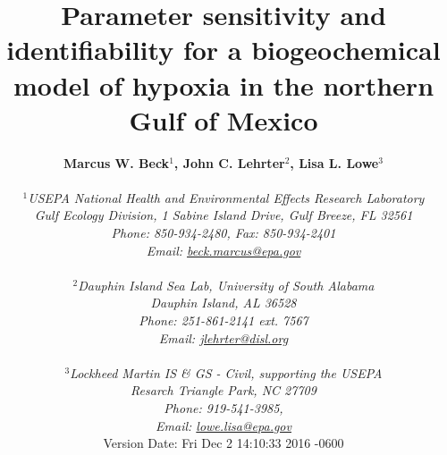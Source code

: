 \documentclass[letterpaper,12pt,oneside]{article}\usepackage[]{graphicx}\usepackage[]{color}
\begin{document}
\raggedbottom
\linenumbers
\raggedright
{}
\setlength{\parindent}{0.5in}
\renewcommand\refname{References \vspace{12pt}}

\begin{singlespace}
\title{{\bf {\Large Parameter sensitivity and identifiability for a biogeochemical model of hypoxia in the northern {G}ulf of {M}exico}}}
\author{
  {\bf {\normalsize Marcus W. Beck$^1$, John C. Lehrter$^2$, Lisa L. Lowe$^3$}}
  \\\\{\textit {\normalsize $^1$USEPA National Health and Environmental Effects Research Laboratory}}
  \\{\textit {\normalsize Gulf Ecology Division, 1 Sabine Island Drive, Gulf Breeze, FL 32561}}
	\\{\textit {\normalsize Phone: 850-934-2480, Fax: 850-934-2401}}
	\\{\textit {\normalsize Email: \href{mailto:beck.marcus@epa.gov}{beck.marcus@epa.gov}}}
	  \\\\{\textit {\normalsize $^2$Dauphin Island Sea Lab, University of South Alabama}}
  \\{\textit {\normalsize Dauphin Island, AL 36528}}
	\\{\textit {\normalsize Phone: 251-861-2141 ext. 7567}}
	\\{\textit {\normalsize Email: \href{mailto:jlehrter@disl.org}{jlehrter@disl.org}}}
	\\\\{\textit {\normalsize $^3$Lockheed Martin IS \& GS - Civil, supporting the USEPA}}
	\\{\textit {\normalsize Resarch Triangle Park, NC 27709}}
	\\{\textit {\normalsize Phone: 919-541-3985,}}
	\\{\textit {\normalsize Email: \href{mailto:lowe.lisa@epa.gov}{lowe.lisa@epa.gov}}}
  \vspace{1in} 
  \\ Version Date:   Fri Dec 2 14:10:33 2016 -0600
	}
\date{}
\maketitle
\end{singlespace}
\clearpage
\end{document}
